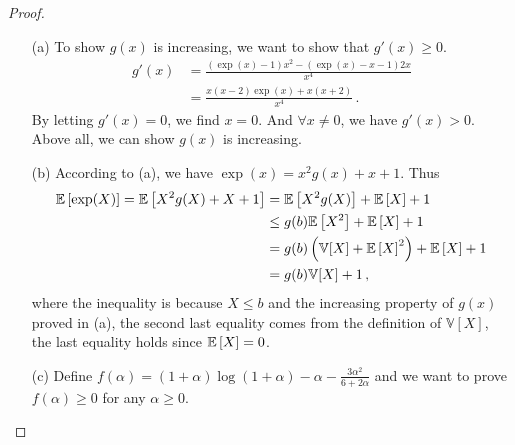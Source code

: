 \begin{proof}
	\begin{enumerate}
		\item[(a)] To show $g(x)$ is increasing, we want to show that $g'(x)\ge 0$. 
		\begin{align*}
			g'(x) &= \frac{(\exp(x)-1)x^2 - (\exp(x)-x-1)2x}{x^4} \\
			&= \frac{x(x-2)\exp(x)+x(x+2)}{x^4}\,.
		\end{align*}
		By letting $g'(x)=0$, we find $x=0$. And $\forall x\neq 0$, we have $g'(x)>0$. Above all, we can show $g(x)$ is increasing. 
		\item[(b)] According to (a), we have $\exp(x) = x^2 g(x)+x+1$. Thus 
		\begin{align*}
			\mathbb{E} \left[\exp(X)\right] = \mathbb{E} \left[ X^2 g(X)+X+1 \right] &= \mathbb{E} \left[X^2 g(X)\right]+\mathbb{E} \left[X\right]+1\\
			&\le g(b)\mathbb{E} \left[X^2\right]+\mathbb{E} \left[X\right]+1\\
			&= g(b) \left(\mathbb{V}[X]+\mathbb{E} \left[X\right]^2\right)+\mathbb{E} \left[X\right]+1 \\
			&= g(b)\mathbb{V}[X]+1\,,
		\end{align*}
		where the inequality is because $X\le b$ and the increasing property of $g(x)$ proved in (a), the second last equality comes from the definition of $\mathbb{V}[X]$, the last equality holds since $\mathbb{E} \left[X\right]=0$.
		\item[(c)]
		Define $f(\alpha)=(1+\alpha)\log (1+\alpha) - \alpha - \frac{3\alpha^2}{6+2\alpha}$ and we want to prove $f(\alpha)\ge 0$ for any $\alpha\ge 0$. 


\end{enumerate}
\end{proof}
